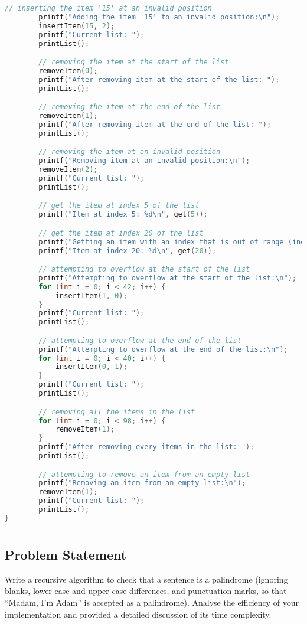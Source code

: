 \documentclass{report}
\begin{document}
\begin{lstlisting}[language=C]
		// inserting the item '15' at an invalid position
		printf("Adding the item '15' to an invalid position:\n");
		insertItem(15, 2);
		printf("Current list: ");
		printList();

		// removing the item at the start of the list
		removeItem(0);
		printf("After removing item at the start of the list: ");
		printList();

		// removing the item at the end of the list
		removeItem(1);
		printf("After removing item at the end of the list: ");
		printList();

		// removing the item at an invalid position
		printf("Removing item at an invalid position:\n");
		removeItem(2);
		printf("Current list: ");
		printList();

		// get the item at index 5 of the list
		printf("Item at index 5: %d\n", get(5));

		// get the item at index 20 of the list
		printf("Getting an item with an index that is out of range (index 20):\n");
		printf("Item at index 20: %d\n", get(20));

		// attempting to overflow at the start of the list
		printf("Attempting to overflow at the start of the list:\n");
		for (int i = 0; i < 42; i++) {
			insertItem(1, 0);
		}
		printf("Current list: ");
		printList();

		// attempting to overflow at the end of the list
		printf("Attempting to overflow at the end of the list:\n");
		for (int i = 0; i < 40; i++) {
			insertItem(0, 1);
		}
		printf("Current list: ");
		printList();

		// removing all the items in the list
		for (int i = 0; i < 98; i++) {
			removeItem(1);
		}
		printf("After removing every items in the list: ");
		printList();

		// attempting to remove an item from an empty list
		printf("Removing an item from an empty list:\n");
		removeItem(1);
		printf("Current list: ");
		printList();
}
\end{lstlisting}
\chapter{}
\section{Problem Statement}
Write a recursive algorithm to check that a sentence is a palindrome (ignoring blanks, lower case and upper case differences, and punctuation marks, so that ``Madam, I'm Adam'' is accepted as a palindrome). Analyse the efficiency of your implementation and provided a detailed discussion of its time complexity.
\end{document}

